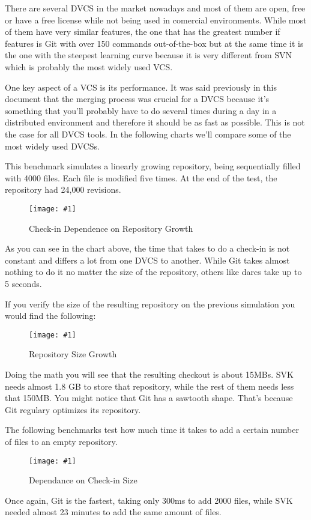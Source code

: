 \documentclass[a4paper,10pt]{article}
\newcommand{\diagrama}[2]{
    \begin{figure}[h]
        \begin{center}
            \texttt{[image: \#1]} 
        \end{center}
        \caption{#2}
    \end{figure}
}
\begin{document}
There are several DVCS in the market nowadays and most of them are open, free or have a free license while not being used in comercial environments. While most of them have very similar features, the one that has the greatest number if features is Git with over 150 commands out-of-the-box but at the same time it is the one with the steepest learning curve because it is very different from SVN which is probably the most widely used VCS.

One key aspect of a VCS is its performance. It was said previously in this document that the merging process was crucial for a DVCS because it's something that you'll probably have to do several times during a day in a distributed environment and therefore it should be as fast as possible. This is not the case for all DVCS tools. In the following charts\cite{dvcsperfcomparison} we'll compare some of the most widely used DVCSs.

This benchmark simulates a linearly growing repository, being sequentially filled with 4000 files. Each file is modified five times. At the end of the test, the repository had 24,000 revisions. 

\diagrama{dvcs_roundup_plot_commits.jpg}{Check-in Dependence on Repository Growth}

As you can see in the chart above, the time that takes to do a check-in is not constant and differs a lot from one DVCS to another. While Git takes almost nothing to do it no matter the size of the repository, others like darcs take up to 5 seconds.

If you verify the size of the resulting repository on the previous simulation you would find the following:

\diagrama{dvcs_roundup_plot_sizes.jpg}{Repository Size Growth}

Doing the math you will see that the resulting checkout is about 15MBs. SVK needs almost 1.8 GB to store that repository, while the rest of them needs less that 150MB. You might notice that Git has a sawtooth shape. That's because Git regulary optimizes its repository.

The following benchmarks test how much time it takes to add a certain number of files to an empty repository.

\diagrama{dvcs_roundup_plot_steps1.jpg}{Dependance on Check-in Size}

Once again, Git is the fastest, taking only 300ms to add 2000 files, while SVK needed almost 23 minutes to add the same amount of files.
\end{document}
